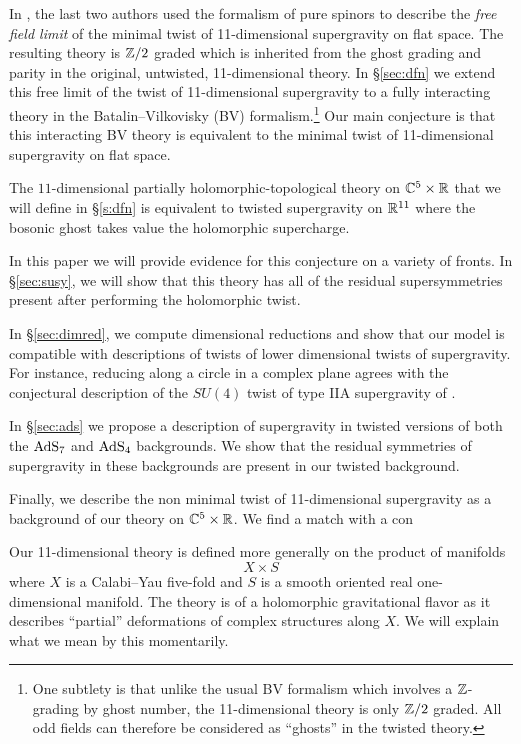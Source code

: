 In \cite{SWspinor}, the last two authors used the formalism of pure spinors to describe the {\em free field limit} of the minimal twist of 11-dimensional supergravity on flat space.
The resulting theory is $\mathbb Z/2$ graded which is inherited from the ghost grading and parity in the original, untwisted, 11-dimensional theory.
In \S\ref{sec:dfn} we extend this free limit of the twist of 11-dimensional supergravity to a fully interacting theory in the Batalin--Vilkovisky (BV) formalism.\footnote{One subtlety is that unlike the usual BV formalism which involves a $\mathbb Z$-grading by ghost number, the 11-dimensional theory is only $\mathbb Z/2$ graded.
All odd fields can therefore be considered as ``ghosts'' in the twisted theory.}
Our main conjecture is that this interacting BV theory is equivalent to the minimal twist of 11-dimensional supergravity on flat space.

\begin{conj}
The $11$-dimensional partially holomorphic-topological theory on $\mathbb C^5 \times \mathbb R$ that we will define in \S \ref{s:dfn} is equivalent to twisted supergravity on $\mathbb R^{11}$ where the bosonic ghost takes value the holomorphic supercharge. 
\end{conj}

In this paper we will provide evidence for this conjecture on a variety of fronts. 
In \S\ref{sec:susy}, we will show that this theory has all of the residual supersymmetries present after performing the holomorphic twist. 

In \S\ref{sec:dimred}, we compute dimensional reductions and show that our model is compatible with descriptions of twists of lower dimensional twists of supergravity. 
For instance, reducing along a circle in a complex plane agrees with the conjectural description of the $SU(4)$ twist of type IIA supergravity of \cite{CLsugra}.

In \S\ref{sec:ads} we propose a description of supergravity in twisted versions of both the ${\rm AdS}_7$ and ${\rm AdS}_4$ backgrounds. 
We show that the residual symmetries of supergravity in these backgrounds are present in our twisted background.

Finally, we describe the non minimal twist of 11-dimensional supergravity as a background of our theory on $\mathbb C^5 \times \mathbb R$. 
We find a match with a con 


Our 11-dimensional theory is defined more generally on the product of manifolds 
\[
X \times S
\]
where $X$ is a Calabi--Yau five-fold and $S$ is a smooth oriented real one-dimensional manifold. 
The theory is of a holomorphic gravitational flavor as it describes ``partial'' deformations of complex structures along $X$. 
We will explain what we mean by this momentarily. 

